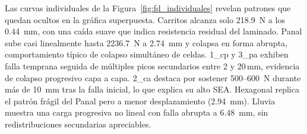 \documentclass[12pt, a4paper, twocolumn]{article}
\begin{document}
Las curvas individuales de la Figura~\ref{fig:fd_individuales} revelan patrones que
quedan ocultos en la gráfica superpuesta. Carritos alcanza solo \SI{218.9}{N} a los
\SI{0.44}{mm}, con una caída suave que indica resistencia residual del laminado.
Panal sube casi linealmente hasta \SI{2236.7}{N} a \SI{2.74}{mm} y colapsa en
forma abrupta, comportamiento típico de colapso simultáneo de celdas. 1\_cp y 3\_pa
exhiben falla temprana seguida de múltiples picos secundarios entre 2 y 20\,mm,
evidencia de colapso progresivo capa a capa. 2\_ca destaca por sostener
\SI{500}{}--\SI{600}{N} durante más de \SI{10}{mm} tras la falla inicial, lo que
explica su alto SEA. Hexagonal replica el patrón frágil del Panal pero a menor
desplazamiento (\SI{2.94}{mm}). Lluvia muestra una carga progresiva no lineal con
falla abrupta a \SI{6.48}{mm}, sin redistribuciones secundarias apreciables.
\end{document}

